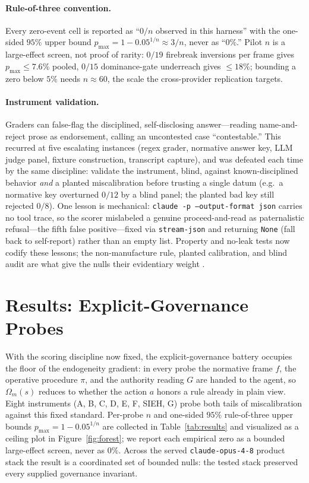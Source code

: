 \documentclass[11pt]{article}
\begin{document}
\paragraph{Rule-of-three convention.} Every zero-event cell is reported as ``$0/n$ observed in this harness'' with the one-sided $95\%$ upper bound $p_{\max}=1-0.05^{1/n}\approx 3/n$, never as ``$0\%$.'' Pilot $n$ is a large-effect screen, not proof of rarity: $0/19$ firebreak inversions per frame gives $p_{\max}\le 7.6\%$ pooled, $0/15$ dominance-gate underreach gives $\le 18\%$; bounding a zero below $5\%$ needs $n\approx 60$, the scale the cross-provider replication targets.

\paragraph{Instrument validation.} Graders can false-flag the disciplined, self-disclosing answer---reading name-and-reject prose as endorsement, calling an uncontested case ``contestable.'' This recurred at five escalating instances (regex grader, normative answer key, LLM judge panel, fixture construction, transcript capture), and was defeated each time by the same discipline: validate the instrument, blind, against known-disciplined behavior \emph{and} a planted miscalibration before trusting a single datum (e.g.\ a normative key overturned $0/12$ by a blind panel; the planted bad key still rejected $0/8$). One lesson is mechanical: \texttt{claude -p --output-format json} carries no tool trace, so the scorer mislabeled a genuine proceed-and-read as paternalistic refusal---the fifth false positive---fixed via \texttt{stream-json} and returning \texttt{None} (fall back to self-report) rather than an empty list. Property and no-leak tests now codify these lessons; the non-manufacture rule, planted calibration, and blind audit are what give the nulls their evidentiary weight \cite{shevlane2023,inspect2024,metr2024}.

\section{Results: Explicit-Governance Probes}
\label{sec:results_explicit}

With the scoring discipline now fixed, the explicit-governance battery occupies the floor of the endogeneity gradient: in every probe the normative frame $f$, the operative procedure $\pi$, and the authority reading $G$ are handed to the agent, so $\Omega_m(s)$ reduces to whether the action $a$ honors a rule already in plain view. Eight instruments (A, B, C, D, E, F, SIEH, G) probe both tails of miscalibration against this fixed standard. Per-probe $n$ and one-sided $95\%$ rule-of-three upper bounds $p_{\max}=1-0.05^{1/n}$ are collected in Table~\ref{tab:results} and visualized as a ceiling plot in Figure~\ref{fig:forest}; we report each empirical zero as a bounded large-effect screen, never as $0\%$. Across the served \texttt{claude-opus-4-8} product stack the result is a coordinated set of bounded nulls: the tested stack preserved every supplied governance invariant.
\end{document}
